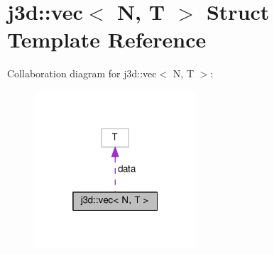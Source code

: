 \hypertarget{structj3d_1_1vec}{}\section{j3d\+:\+:vec$<$ N, T $>$ Struct Template Reference}
\label{structj3d_1_1vec}


Collaboration diagram for j3d\+:\+:vec$<$ N, T $>$\+:
\nopagebreak
\begin{figure}[H]
\begin{center}
\leavevmode
\includegraphics[width=169pt]{structj3d_1_1vec__coll__graph}
\end{center}
\end{figure}
